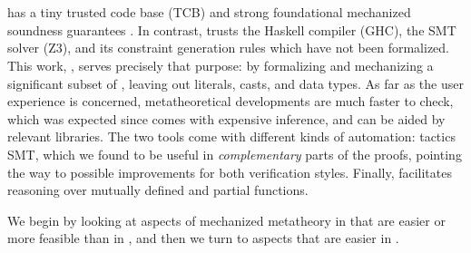 %
%
%
%
%


\section{\coq \vs \lh}
\coq has a tiny trusted code base (TCB) 
and strong foundational mechanized soundness 
guarantees \cite{coqcoqcorrect}.
%
In contrast, \lh trusts the Haskell compiler (GHC), 
the SMT solver (Z3), and its constraint generation rules 
which have not been formalized. 
%
This work, \sysrf, serves precisely that purpose: by
formalizing and mechanizing a significant subset of \lh, 
leaving out literals, casts, and data types. 
%
As far as the user experience is concerned, 
\coq metatheoretical developments 
are much faster to check, which was 
expected since \lh comes with expensive 
inference, and can be aided by relevant libraries. 
The two tools come with different kinds of automation: 
tactics \vs SMT, which we found to be useful in \emph{complementary} 
parts of the proofs, pointing the way to possible improvements
for both verification styles.
Finally, \lh facilitates reasoning over 
mutually defined and partial functions. 
%
%
\begin{fullversion}
We begin by looking at aspects of mechanized metatheory in \coq
that are easier or more feasible than in \lh, and then we
turn to aspects that are easier in \lh.
\end{fullversion}


